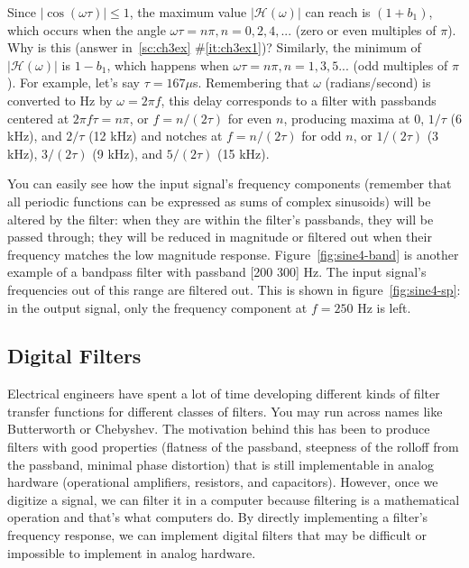 Since $|\cos(\omega\tau)|\leq 1$, the maximum value
$|\mathcal{H}(\omega)|$ can reach is $(1+b_1)$, which occurs when the
angle $\omega\tau=n\pi, n=0,2,4,...$ (zero or even multiples of
$\pi$). Why is this (answer in~\ref{sc:ch3ex} \#\ref{it:ch3ex1})?
Similarly, the minimum of $|\mathcal{H}(\omega)|$ is $1-b_1$, which
happens when $\omega\tau=n\pi, n=1,3,5...$ (odd multiples of $\pi$).
For example, let's say $\tau=167 \mu$s.  Remembering that $\omega$
(radians/second) is converted to Hz by $\omega=2\pi f$, this delay
corresponds to a filter with passbands centered at $2\pi f \tau =
n\pi$, or $f = n/(2\tau)$ for even $n$, producing maxima at 0,
$1/\tau$ (6 kHz), and $2/\tau$ (12 kHz) and notches at $f = n/(2\tau)$
for odd $n$, or $1/(2\tau)$ (3 kHz), $3/(2\tau)$ (9 kHz), and
$5/(2\tau)$ (15 kHz).

You can easily see how the input signal's frequency components
(remember that all periodic functions can be expressed as sums of
complex sinusoids) will be altered by the filter: when they are within
the filter's passbands, they will be passed through; they will be
reduced in magnitude or filtered out when their frequency matches the
low magnitude response. Figure~\ref{fig:sine4-band} is another example
of a bandpass filter with passband [200 300] Hz. The input signal's
frequencies out of this range are filtered out. This is shown in
figure~\ref{fig:sine4-sp}: in the output signal, only the frequency
component at $f=250$ Hz is left.


\subsection{Digital Filters}

Electrical engineers have spent a lot of time developing different
kinds of filter transfer functions for different classes of filters.
You may run across names like Butterworth or Chebyshev. The motivation
behind this has been to produce filters with good properties (flatness
of the passband, steepness of the rolloff from the passband, minimal
phase distortion) that is still implementable in analog hardware
(operational amplifiers, resistors, and capacitors). However, once we
digitize a signal, we can filter it in a computer because filtering is
a mathematical operation and that's what computers do. By directly
implementing a filter's frequency response, we can implement digital
filters that may be difficult or impossible to implement in analog
hardware.

